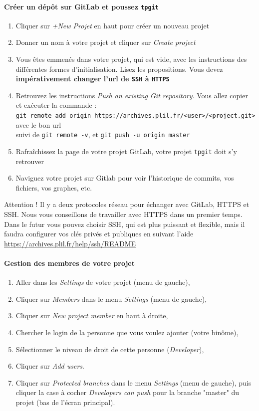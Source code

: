 \documentclass[final, a4paper, openbib, ]{article}
\begin{document}
\paragraph{Créer un dépôt sur GitLab et poussez \texttt{tpgit}}
\begin{enumerate}
\item Cliquer sur \textit{+New Projet} en haut pour créer un nouveau projet
\item Donner un nom à votre projet et cliquer sur \textit{Create project}
\item Vous êtes emmenés dans votre projet, qui est vide, avec les instructions des différentes formes d'initialisation.
Lisez les propositions.
Vous devez \textbf{impérativement changer l'url de \texttt{SSH} à \texttt{HTTPS}}
\item Retrouvez les instructions \textit{Push an existing Git repository}. Vous allez copier et exécuter la commande :\\ \texttt{git remote add origin https://archives.plil.fr/<user>/<project.git>} avec le bon url\\ suivi de \texttt{git remote -v}, et \texttt{git push -u origin master}
\item Rafraîchissez la page de votre projet GitLab, votre projet \texttt{tpgit} doit s'y retrouver
\item Naviguez votre projet sur Gitlab pour voir l'historique de commits, vos fichiers, vos graphes, etc.
\end{enumerate}	

\begin{alertinfo2}{Attention !}
Il y a deux protocoles réseau pour échanger avec GitLab, HTTPS et SSH. Nous vous conseillons de travailler avec HTTPS dans un premier temps.
Dans le futur vous pouvez choisir SSH, qui est plus puissant et flexible, mais il faudra configurer vos clés privés et publiques en suivant l'aide \url{https://archives.plil.fr/help/ssh/README}
\end{alertinfo2}


\paragraph{Gestion des membres de votre projet}
\begin{enumerate}
\item Aller dans les \textit{Settings} de votre projet (menu de gauche),
\item Cliquer sur \textit{Members} dans le menu \textit{Settings} (menu de gauche),
\item Cliquer sur \textit{New project member} en haut à droite,
\item Chercher le login de la personne que vous voulez ajouter (votre binôme),
\item Sélectionner le niveau de droit de cette personne (\textit{Developer}),
\item Cliquer sur \textit{Add users}.
\item Cliquer sur \textit{Protected branches} dans le menu \textit{Settings} (menu de gauche), puis cliquer la case à cocher \textit{Developers can push} pour la branche "master" du projet (bas de l'écran principal).
\end{enumerate}
\end{document}
